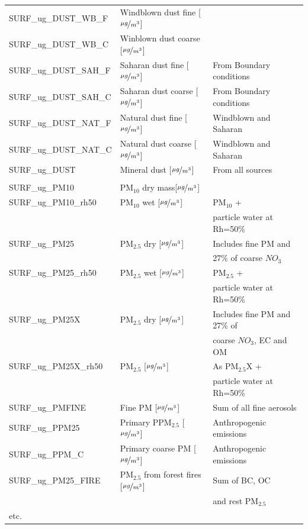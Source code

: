\documentclass[a4paper,12pt]{report}
\newcommand{\tug}{$\nicefrac{\mu g}{m^{3}}$}
\begin{document}
\begin{center}
\begin{longtable}{lll}
    SURF\_ug\_DUST\_WB\_F & Windblown dust fine  [\tug]&  \\
    SURF\_ug\_DUST\_WB\_C & Winblown dust coarse [\tug]&  \\
    SURF\_ug\_DUST\_SAH\_F & Saharan dust fine  [\tug]& From Boundary conditions \\
    SURF\_ug\_DUST\_SAH\_C & Saharan dust coarse [\tug]&From Boundary conditions \\
    SURF\_ug\_DUST\_NAT\_F & Natural dust fine  [\tug]& Windblown and Saharan \\
    SURF\_ug\_DUST\_NAT\_C & Natural dust coarse [\tug]& Windblown and Saharan \\
    SURF\_ug\_DUST & Mineral dust  [\tug]& From all sources \\
    & & \\
    SURF\_ug\_PM10 & PM$_{10}$ dry mass[\tug]&  \\
    SURF\_ug\_PM10\_rh50 & PM$_{10}$ wet [\tug]&PM$_{10}$ +\\ 
    & & particle water at Rh=50\% \\
    SURF\_ug\_PM25 & PM$_{2.5}$ dry [\tug]& Includes fine PM and  \\ & & 27\% of
    coarse $NO_{3}$  \\
    SURF\_ug\_PM25\_rh50 & PM$_{2.5}$ wet [\tug]& PM$_{2.5}$ + \\
    & & particle water at Rh=50\% \\
    SURF\_ug\_PM25X & PM$_{2.5}$ dry [\tug]& Includes fine PM and 27\% of
     \\ & & coarse $NO_{3}$, EC and OM \\
    SURF\_ug\_PM25X\_rh50 & PM$_{2.5}$ [\tug]& As PM$_{2.5}$X + \\ &&
    particle water at Rh=50\% \\

    SURF\_ug\_PMFINE & Fine PM [\tug]& Sum of all fine aerosols \\
    SURF\_ug\_PPM25 & Primary PPM$_{2.5}$ [\tug]& Anthropogenic emissions \\
    SURF\_ug\_PPM\_C & Primary coarse PM [\tug]& Anthropogenic
    emissions \\
    SURF\_ug\_PM25\_FIRE & PM$_{2.5}$ from forest fires [\tug]& Sum of BC, OC \\
    & & and rest PM$_{2.5}$ \\
etc.& &\\ \hline


\end{longtable}
\end{center}
\end{document}
